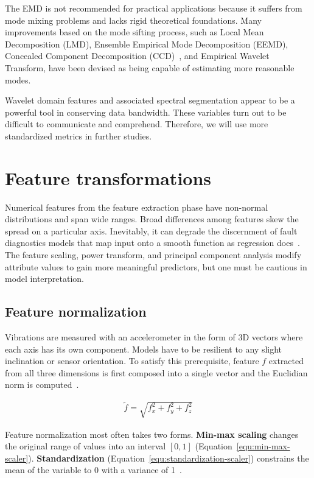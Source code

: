 The EMD is not recommended for practical applications because it suffers from mode mixing problems and lacks rigid theoretical foundations. Many improvements based on the mode sifting process, such as Local Mean Decomposition (LMD), Ensemble Empirical Mode Decomposition (EEMD), Concealed Component Decomposition (CCD)~\cite{tiwari_novel_2021}, and Empirical Wavelet Transform, have been devised as being capable of estimating more reasonable modes.

Wavelet domain features and associated spectral segmentation appear to be a powerful tool in conserving data bandwidth. These variables turn out to be difficult to communicate and comprehend. Therefore, we will use more standardized metrics in further studies.

\section{Feature transformations} \label{section:feature-selection}
Numerical features from the feature extraction phase have non-normal distributions and span wide ranges. Broad differences among features skew the spread on a particular axis. Inevitably, it can degrade the discernment of fault diagnostics models that map input onto a smooth function as regression does~\cite{zheng_feature_2018}. The feature scaling, power transform, and principal component analysis modify attribute values to gain more meaningful predictors, but one must be cautious in model interpretation.

\subsection{Feature normalization}
Vibrations are measured with an accelerometer in the form of 3D vectors where each axis has its own component. Models have to be resilient to any slight inclination or sensor orientation. To satisfy this prerequisite, feature $f$ extracted from all three dimensions is first composed into a single vector and the Euclidian norm is computed~\cite{kamminga_robust_2018}.

\begin{ceqn}\begin{align}
\widetilde{f} = \sqrt{f_x^2 + f_y^2 + f_z^2}
\end{align}\end{ceqn}

Feature normalization most often takes two forms. \textbf{Min-max scaling} changes the original range of values into an interval $[0, 1]$ (Equation~\ref{equ:min-max-scaler}). \textbf{Standardization} (Equation~\ref{equ:standardization-scaler}) constrains the mean of the variable to 0 with a variance of 1~\cite{zheng_feature_2018}.

